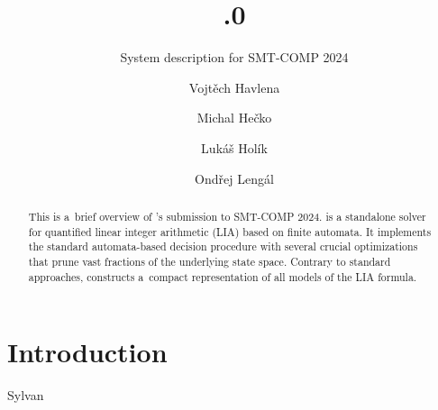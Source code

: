 \documentclass[acmsmall,screen,nonacm=true]{acmart}
\begin{document}
\title{.0}
\subtitle{System description for SMT-COMP 2024}

\author{Vojtěch Havlena}

\author{Michal Hečko}

\author{Lukáš Holík}

\author{Ondřej Lengál}



\begin{abstract}
  This is a~brief overview of \amaya's submission to SMT-COMP 2024.
  \amaya is a standalone solver for quantified linear integer arithmetic (LIA) based on finite automata.
  It implements the standard automata-based decision procedure with several crucial optimizations that prune vast fractions of the underlying state space.
  Contrary to standard approaches, \amaya constructs a~compact representation of all models of the LIA formula.
\end{abstract}

\maketitle


\section{Introduction}

\ol{}

Sylvan~\cite{DijkP15}



\end{document}
